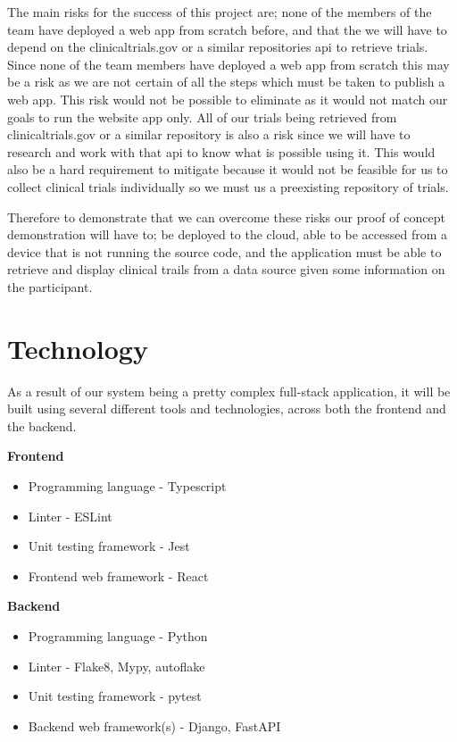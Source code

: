 \documentclass{article}
\begin{document}
The main risks for the success of this project are; 
none of the members of the team have deployed a web app from scratch before, 
and that the we will have to depend on the clinicaltrials.gov or a similar repositories api to retrieve trials. 
Since none of the team members have deployed a web app from scratch this may be a risk as we are 
not certain of all the steps which must be taken to publish a web app.
This risk would not be possible to eliminate as it would not match our goals to run the website app only.
All of our trials being retrieved from clinicaltrials.gov or a similar repository is also a risk since we will have to 
research and work with that api to know what is possible using it. This would also be a hard requirement to mitigate
because it would not be feasible for us to collect clinical trials individually so we must us a preexisting repository of trials. 

Therefore to demonstrate that we can overcome these risks our proof of concept demonstration will have to; 
be deployed to the cloud, able to be accessed from a device that is not running the source code, 
and the application must be able to retrieve and display clinical trails from a data source given some information on the participant.

\section{Technology}

As a result of our system being a pretty complex full-stack application, it will be built
using several different tools and technologies, across both the frontend and the backend.
\begin{flushleft}
	\textbf{Frontend}	
\end{flushleft}

\begin{itemize}
	\item Programming language - Typescript
	\item Linter - ESLint
	\item Unit testing framework - Jest
	\item Frontend web framework - React
\end{itemize}

\begin{flushleft}
	\textbf{Backend}	
\end{flushleft}

\begin{itemize}
	\item Programming language - Python
	\item Linter - Flake8, Mypy, autoflake
	\item Unit testing framework - pytest
	\item Backend web framework(s) - Django, FastAPI
\end{itemize}
\end{document}

